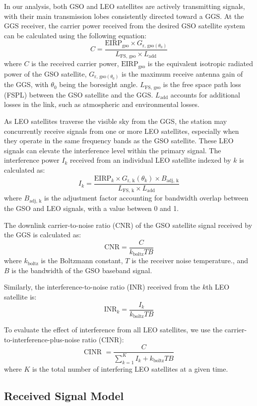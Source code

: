 \documentclass[12pt]{article}
\begin{document}
In our analysis, both GSO and LEO satellites are actively transmitting signals, with their main transmission lobes consistently directed toward a GGS. At the GGS receiver, the carrier power received from the desired GSO satellite system can be calculated using the following equation:
$$
    C = \frac{\text{EIRP}_{\text{gso}} \times G_{\text{r, gso}(\theta_0)}}{L_{\text{FS, gso}} \times  L_{\text{add}}}
$$
where $C $ is the received carrier power, $\text{EIRP}_{\text{gso}}$ is the equivalent isotropic radiated power of the GSO satellite, $G_{\text{r, gso}(\theta_0)}$ is the maximum receive antenna gain of the GGS, with $\theta_0$ being the boresight angle. $L_{\text{FS, gso}}$ is the free space path loss (FSPL) between the GSO satellite and the GGS. $L_{\text{add}}$ accounts for additional losses in the link, such as atmospheric and environmental losses.

As LEO satellites traverse the visible sky from the GGS, the station may concurrently receive signals from one or more LEO satellites, especially when they operate in the same frequency bands as the GSO satellite. These LEO signals can elevate the interference level within the primary signal. The interference power $I_k$ received from an individual LEO satellite indexed by $k$ is calculated as:
$$
    I_k = \frac{\text{EIRP}_{k} \times G_{\text{r, k}}(\theta_k) \times B_{\text{adj, k}}}{L_{\text{FS, k} }\times  L_{\text{add}}}
$$
where $B_{\text{adj, k}}$ is the adjustment factor accounting for bandwidth overlap between the GSO and LEO signals, with a value between 0 and 1.

The downlink carrier-to-noise ratio (CNR) of the GSO satellite signal received by the GGS is calculated as:
$$
    \text{CNR} = \frac{C }{k_{\text{boltz}}TB}
$$
where $k_{\text{boltz}}$ is the Boltzmann constant, $T$ is the receiver noise temperature., and $B$ is the bandwidth of the GSO baseband signal.

Similarly,  the interference-to-noise ratio (INR) received from the $k$th LEO satellite is:
$$
    \text{INR}_k = \frac{I_k }{k_{\text{boltz}}TB}
$$

To evaluate the effect of interference from all LEO satellites, we use the carrier-to-interference-plus-noise ratio (CINR):
$$
    \text{CINR } = \frac{C }{\sum_{k=1}^{K }I_k + k_{\text{boltz}}TB}
$$
where $K$ is the total number of interfering LEO satellites at a given time.

\subsection{Received Signal Model}
\end{document}
